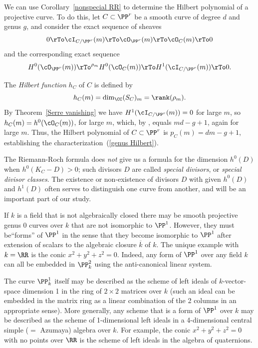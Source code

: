 We can  use Corollary~\ref{nonspecial RR} to determine the Hilbert polynomial of a projective curve. To do this, let $C \subset \PP^r$ be a smooth curve of degree $d$ and genus $g$, and consider the exact sequence of sheaves
$$
0 \rTo \cI_{C/\PP^r}(m) \rTo \cO_{\PP^r}(m) \rTo \cO_C(m) \rTo 0
$$
and the corresponding exact sequence
$$
 H^0(\cO_{\PP^r}(m)) \rTo^{\rho_m} H^0(\cO_C(m)) \rTo H^1(\cI_{C/\PP^r}(m)) \rTo 0.
$$

The \emph{Hilbert function} $h_C$ of $C$  is defined by
$$
h_C(m) = \dim_{\CC} (S_{C})_{m} = \rank(\rho_m).
$$
By Theorem~\ref{Serre vanishing} we have $H^1(\cI_{C/\PP^r}(m)) = 0$ for large $m$, so $h_{C}(m) = h^0(\cO_C(m))$, for large $m$, which, by \trr, equals $md-g+1$, again for large $m$. Thus, the Hilbert polynomial of $C \subset \PP^r$ is $p_C(m) = dm-g+1$, establishing the characterization~(\ref{genus Hilbert}).
 
The Riemann-Roch formula does \emph{not} give us a formula for the dimension $h^0(D)$ when $h^0(K_C - D)>0$; such divisors $D$ are called \emph{special divisors}, or \emph{special divisor classes}. The existence or non-existence of divisors $D$ with given $h^{0}(D)$ and $h^{1}(D)$ often serves to distinguish one curve from another, and will be an important part of our study.

\begin{fact}
If $k$ is a field that is not algebraically closed there may be smooth projective genus 0 curves over $k$ that are not isomorphic to $\PP^1$. However, they must be``forms'' of $\PP^1$ in the sense that they become isomorphic to $\PP^1$ after extension of scalars to 
the algebraic closure $\overline k$ of $k$. The unique example with $k = \RR$ is the conic $x^2+y^2+z^2 = 0$. Indeed, any form of $\PP^1$ over any field $k$ can all be embedded in $\PP_{k}^2$  using the anti-canonical linear system.

The curve $\PP_k^1$ itself may be described as the scheme of left ideals of $k$-vector-space dimension 1 in the ring of
$2\times 2$ matrices over $k$ (such an ideal can be embedded in the matrix ring as a linear combination of the 2 columns in an appropriate sense). More generally, any scheme that is a form of $\PP^1$ over $k$
may be described as the scheme of 1-dimensional left ideals in a 4-dimensional central simple ($=$ Azumaya) algebra over $k$. For example, the
conic $x^2+y^2+z^2 = 0$ with no points over $\RR$ is the scheme of left ideals in the algebra of quaternions.\end{fact}

